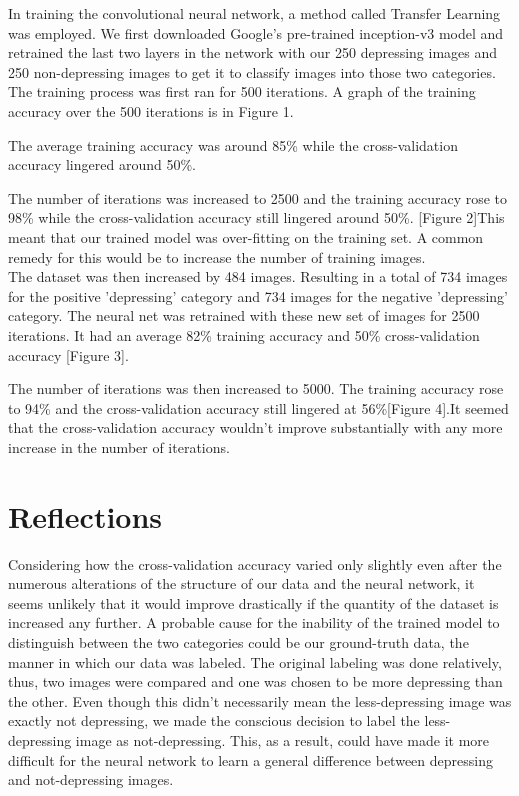 \documentclass[12pt]{article}
\begin{document}
In training the convolutional neural network, a method called Transfer Learning was employed. We first downloaded Google's pre-trained inception-v3 model and retrained the last two layers in the network with our 250 depressing images and 250 non-depressing images to get it to classify images into those two categories. The training process was first ran for 500 iterations. A graph of the training accuracy over the 500 iterations is in Figure 1.


The average training accuracy was around 85\% while the cross-validation accuracy lingered around 50\%.

The number of iterations was increased to 2500 and the training accuracy rose to 98\% while the cross-validation accuracy still lingered around 50\%. [Figure 2]This meant that our trained model was over-fitting on the training set. A common remedy for this would be to increase the number of training images.\\




The dataset was then increased by 484 images. Resulting in a total of 734 images for the positive 'depressing' category and 734 images for the negative  'depressing' category. The neural net was retrained with these new set of images for 2500 iterations. It had an average 82\% training accuracy and 50\% cross-validation accuracy [Figure 3]. 



\newpage
The number of iterations was then increased to 5000. The training accuracy rose to 94\% and the cross-validation accuracy still lingered at 56\%[Figure 4].It seemed that the cross-validation accuracy wouldn't improve substantially with any more increase in the number of iterations. 



\section{Reflections}
Considering how the cross-validation accuracy varied only slightly even after the numerous alterations of the structure of our data and the neural network, it seems unlikely that it would improve drastically if the quantity of the dataset is increased any further. A probable cause for the inability of the trained model to distinguish between the two categories could be our ground-truth data, the manner in which our data was labeled. The original labeling was done relatively, thus, two images were compared and one was chosen to be more depressing than the other. Even though this didn't necessarily mean the less-depressing image was exactly not depressing, we made the conscious decision to label the less-depressing image as not-depressing. This, as a result, could have made it more difficult for the neural network to learn a general difference between depressing and not-depressing images. 
\end{document}
